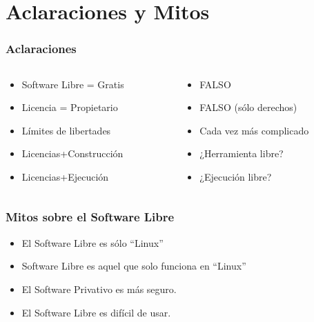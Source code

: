 \documentclass{beamer}
\begin{document}
	\section{Aclaraciones y Mitos}
		\begin{frame}
			\frametitle{Aclaraciones}
			\begin{columns}
				\begin{column}[l]{5cm}
					\begin{itemize}
						\item<2-> Software Libre = Gratis
						\item<3-> Licencia = Propietario
						\item<4-> Límites de libertades
						\item<5-> Licencias+Construcción
						\item<6-> Licencias+Ejecución
					\end{itemize}
				\end{column}
				\begin{column}[r]{5cm}
					\begin{itemize}
						\item<2-> FALSO
						\item<3-> FALSO (sólo derechos)
						\item<4-> Cada vez más complicado
						\item<5-> ¿Herramienta libre?
						\item<6-> ¿Ejecución libre?
					\end{itemize}
				\end{column}
			\end{columns}
		\end{frame}
		\begin{frame}
			\frametitle{Mitos sobre el Software Libre}
			\begin{itemize}
				\item<2-> El Software Libre es sólo ``Linux''
				\item<3-> Software Libre es aquel que solo funciona en ``Linux''
				\item<4-> El Software Privativo es más seguro.
				\item<5-> El Software Libre es difícil de usar.
			\end{itemize}
		\end{frame}
\end{document}
